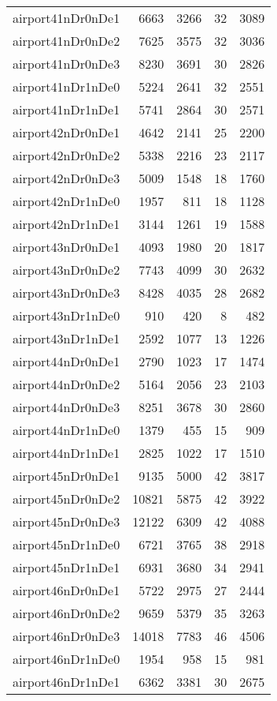 \begin{longtable}{lrrrr}
airport41nDr0nDe1 & 6663 & 3266 & 32 & 3089 \\
airport41nDr0nDe2 & 7625 & 3575 & 32 & 3036 \\
airport41nDr0nDe3 & 8230 & 3691 & 30 & 2826 \\
airport41nDr1nDe0 & 5224 & 2641 & 32 & 2551 \\
airport41nDr1nDe1 & 5741 & 2864 & 30 & 2571 \\
airport42nDr0nDe1 & 4642 & 2141 & 25 & 2200 \\
airport42nDr0nDe2 & 5338 & 2216 & 23 & 2117 \\
airport42nDr0nDe3 & 5009 & 1548 & 18 & 1760 \\
airport42nDr1nDe0 & 1957 & 811 & 18 & 1128 \\
airport42nDr1nDe1 & 3144 & 1261 & 19 & 1588 \\
airport43nDr0nDe1 & 4093 & 1980 & 20 & 1817 \\
airport43nDr0nDe2 & 7743 & 4099 & 30 & 2632 \\
airport43nDr0nDe3 & 8428 & 4035 & 28 & 2682 \\
airport43nDr1nDe0 & 910 & 420 & 8 & 482 \\
airport43nDr1nDe1 & 2592 & 1077 & 13 & 1226 \\
airport44nDr0nDe1 & 2790 & 1023 & 17 & 1474 \\
airport44nDr0nDe2 & 5164 & 2056 & 23 & 2103 \\
airport44nDr0nDe3 & 8251 & 3678 & 30 & 2860 \\
airport44nDr1nDe0 & 1379 & 455 & 15 & 909 \\
airport44nDr1nDe1 & 2825 & 1022 & 17 & 1510 \\
airport45nDr0nDe1 & 9135 & 5000 & 42 & 3817 \\
airport45nDr0nDe2 & 10821 & 5875 & 42 & 3922 \\
airport45nDr0nDe3 & 12122 & 6309 & 42 & 4088 \\
airport45nDr1nDe0 & 6721 & 3765 & 38 & 2918 \\
airport45nDr1nDe1 & 6931 & 3680 & 34 & 2941 \\
airport46nDr0nDe1 & 5722 & 2975 & 27 & 2444 \\
airport46nDr0nDe2 & 9659 & 5379 & 35 & 3263 \\
airport46nDr0nDe3 & 14018 & 7783 & 46 & 4506 \\
airport46nDr1nDe0 & 1954 & 958 & 15 & 981 \\
airport46nDr1nDe1 & 6362 & 3381 & 30 & 2675 \\

\end{longtable}

